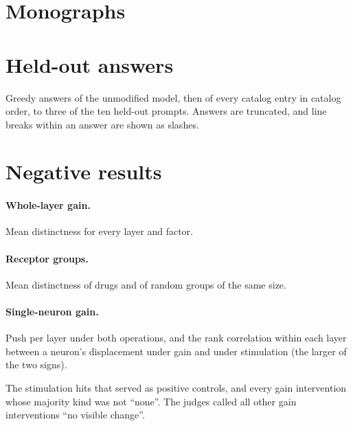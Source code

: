 \documentclass[11pt]{article}
\begin{document}


\clearpage
\section{Monographs}
\label{app:monographs}


\clearpage
\section{Held-out answers}
\label{app:answers}
Greedy answers of the unmodified model, then of every catalog entry in catalog order, to three of the ten held-out
prompts. Answers are truncated, and line breaks within an answer are shown as slashes.



\clearpage
\section{Negative results}
\label{app:negative}

\paragraph{Whole-layer gain.} Mean distinctness for every layer and factor.



\paragraph{Receptor groups.} Mean distinctness of drugs and of random groups of the same size.

\begin{center}

\end{center}

\paragraph{Single-neuron gain.} Push per layer under both operations, and the rank correlation within each layer
between a neuron's displacement under gain and under stimulation (the larger of the two signs).



The stimulation hits that served as positive controls, and every gain intervention whose majority kind was not
``none''. The judges called all other gain interventions ``no visible change''.
\end{document}
